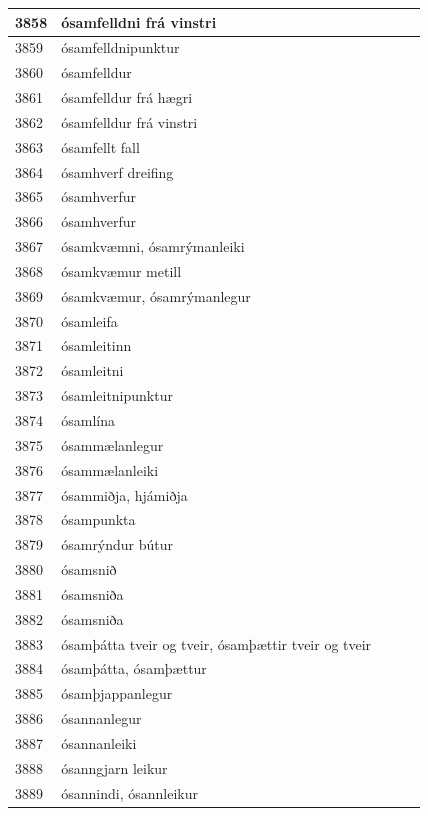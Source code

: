 \begin{longtable}{p{}|p{}|p{}|p{}|p{}}
3858 & ósamfelldni frá vinstri &  &  &  \\
\hline
3859 & ósamfelldnipunktur &  &  &  \\
\hline
3860 & ósamfelldur &  &  &  \\
\hline
3861 & ósamfelldur frá hægri &  &  &  \\
\hline
3862 & ósamfelldur frá vinstri &  &  &  \\
\hline
3863 & ósamfellt fall &  &  &  \\
\hline
3864 & ósamhverf dreifing &  &  &  \\
\hline
3865 & ósamhverfur &  &  &  \\
\hline
3866 & ósamhverfur &  &  &  \\
\hline
3867 & ósamkvæmni, ósamrýmanleiki &  &  &  \\
\hline
3868 & ósamkvæmur metill &  &  &  \\
\hline
3869 & ósamkvæmur, ósamrýmanlegur &  &  &  \\
\hline
3870 & ósamleifa &  &  &  \\
\hline
3871 & ósamleitinn &  &  &  \\
\hline
3872 & ósamleitni &  &  &  \\
\hline
3873 & ósamleitnipunktur &  &  &  \\
\hline
3874 & ósamlína &  &  &  \\
\hline
3875 & ósammælanlegur &  &  &  \\
\hline
3876 & ósammælanleiki &  &  &  \\
\hline
3877 & ósammiðja, hjámiðja &  &  &  \\
\hline
3878 & ósampunkta &  &  &  \\
\hline
3879 & ósamrýndur bútur &  &  &  \\
\hline
3880 & ósamsnið &  &  &  \\
\hline
3881 & ósamsniða &  &  &  \\
\hline
3882 & ósamsniða &  &  &  \\
\hline
3883 & ósamþátta tveir og tveir, ósamþættir tveir og tveir &  &  &  \\
\hline
3884 & ósamþátta, ósamþættur &  &  &  \\
\hline
3885 & ósamþjappanlegur &  &  &  \\
\hline
3886 & ósannanlegur &  &  &  \\
\hline
3887 & ósannanleiki &  &  &  \\
\hline
3888 & ósanngjarn leikur &  &  &  \\
\hline
3889 & ósannindi, ósannleikur &  &  &  \\

\end{longtable}
